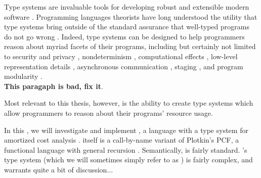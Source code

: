 Type systems are invaluable tools for developing robust and extensible modern software \citehere. Programming languages theorists have long understood the utility that type systems bring outside of the standard assurance that well-typed programs do not go wrong \citehere. Indeed, type systems can be designed to help programmers reason about myriad facets of their programs, including but certainly not limited to security and privacy \citehere, nondeterminism \citehere, computational effects \citehere, low-level representation details , asynchronous communication , staging \citehere, and program modularity . 
\\

\textbf{This paragaph is bad, fix it}.

Most relevant to this thesis, however, is the ability to create type systems which allow programmers to reason about their programs' resource usage.


In this , we will investigate and implement \lambdaamor, a language with a type system for amortized cost analysis \citep{rajani-et-al:popl21}. \lambdaamor itself is a call-by-name variant of Plotkin's PCF, a functional language with general recursion \citehere. Semantically, \lambdaamor is fairly standard.
 \lambdaamor's type system (which we will sometimes simply refer to as \lambdaamor) is fairly complex, and warrants quite a bit of discussion... 

